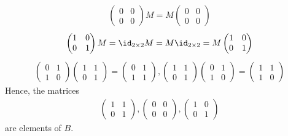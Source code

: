 \documentclass[12pt,a4paper]{article}
\begin{document}
\begin{align*}
\begin{pmatrix}
0 & 0 \\
0 & 0
\end{pmatrix}
M = M\begin{pmatrix}
0 & 0 \\
0 & 0
\end{pmatrix}
\end{align*}
\begin{align*}
\begin{pmatrix}
1 & 0 \\
0 & 1
\end{pmatrix}
M = \id_{2 \times 2} M = M \id_{2 \times 2} = M \begin{pmatrix}
1 & 0 \\
0 & 1
\end{pmatrix}
\end{align*}
\begin{align*}
\begin{pmatrix}
0 & 1 \\
1 & 0
\end{pmatrix}
\begin{pmatrix}
1 & 1 \\
0 & 1
\end{pmatrix} = \begin{pmatrix}
0 & 1 \\
1 & 1
\end{pmatrix}
,
\begin{pmatrix}
1 & 1 \\
0 & 1
\end{pmatrix}
\begin{pmatrix}
0 & 1 \\
1 & 0
\end{pmatrix} = \begin{pmatrix}
1 & 1 \\
1 & 0
\end{pmatrix}
\end{align*}
Hence, the matrices
\begin{align*}
\begin{pmatrix}
1 & 1 \\
0 & 1
\end{pmatrix}
,
\begin{pmatrix}
0 & 0 \\
0 & 0
\end{pmatrix}
,
\begin{pmatrix}
1 & 0 \\
0 & 1
\end{pmatrix}
\end{align*}
are elements of $B$.
\end{document}
